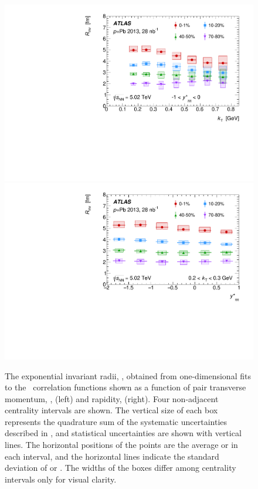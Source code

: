 \begin{figure}[t]
\centering
\includegraphics[width=0.49\linewidth]{canqinv_R_vs_kt.pdf}
\includegraphics[width=0.49\linewidth]{canqinv_R_vs_kys.pdf}
\caption{The exponential invariant radii, \Rinv, obtained from one-dimensional fits to
the \qinv\ correlation functions shown as a function of pair transverse momentum, \kt, (left) and rapidity, \kys (right). Four non-adjacent centrality intervals are shown. The vertical size of each box represents the quadrature sum of the systematic uncertainties described in , and statistical uncertainties are shown with vertical lines. The horizontal positions of the points are the average \kt or \kys in each interval, and the horizontal lines indicate the standard deviation of \kt or \kys. The widths of the boxes differ among centrality intervals only for visual clarity.}
\label{fig:results_Rinv_kt}
\end{figure}
